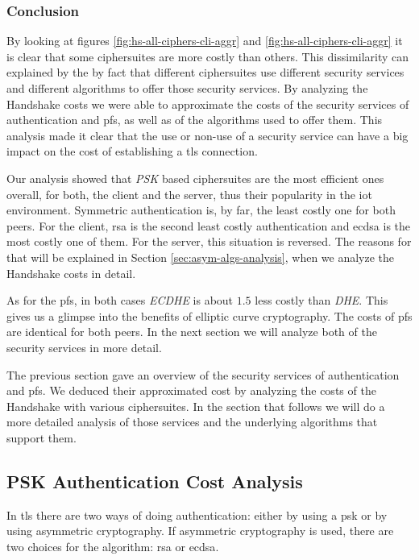 \documentclass{llncs}
\begin{document}
\subsubsection{Conclusion}

By looking at figures \ref{fig:hs-all-ciphers-cli-aggr}
and \ref{fig:hs-all-ciphers-cli-aggr} it is clear that some ciphersuites are more costly than others. This dissimilarity
can explained by the by fact that different ciphersuites use different security services and different algorithms to
offer those security services. By analyzing the Handshake costs we were able to approximate the costs of the security
services of authentication and \gls{pfs}, as well as of the algorithms used to offer them. This analysis made it clear that the
use or non-use of a security service can have a big impact on the cost of establishing a \gls{tls} connection.

Our analysis showed that \textit{PSK} based ciphersuites are the most efficient ones overall, for both, the client
and the server, thus their popularity in the \gls{iot} environment. Symmetric authentication is, by far,
the least costly one for both peers. For the client, \gls{rsa} is the second least costly authentication and \gls{ecdsa}
is the most costly one of them. For the server, this situation is reversed. The reasons for that will be explained in
Section \ref{sec:asym-algs-analysis}, when we analyze the Handshake costs in detail.

As for the \gls{pfs}, in both cases \textit{ECDHE} is about $1.5$ less costly than \textit{DHE}. This gives us a glimpse
into the benefits of elliptic curve cryptography. The costs of \gls{pfs} are identical for both peers. In the next
section we will analyze both of the security services in more detail.

The previous section gave an overview of the security services of authentication and \gls{pfs}. We deduced their
approximated cost by analyzing the costs of the Handshake with various ciphersuites. In the section that follows
we will do a more detailed analysis of those services and the underlying algorithms that support them.

\subsection{PSK Authentication Cost Analysis} \label{sec:psk-cost-analysis}

In \gls{tls} there are two ways of doing authentication: either by using a \gls{psk} or by using asymmetric cryptography.
If asymmetric cryptography is used, there are two choices for the algorithm: \gls{rsa} or \gls{ecdsa}.
\end{document}
